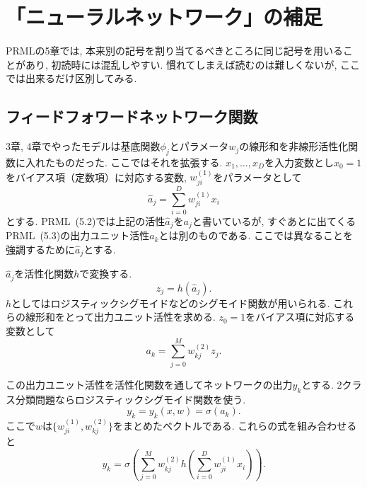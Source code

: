 \setcounter{chapter}{4}
\chapter{「ニューラルネットワーク」の補足}
PRMLの5章では, 本来別の記号を割り当てるべきところに同じ記号を用いることがあり, 初読時には混乱しやすい.
慣れてしまえば読むのは難しくないが, ここでは出来るだけ区別してみる.

\newcommand{\ww}[2]{w_{#1}^{(#2)}}
\newcommand{\calRR}[1]{{\cal R}\left\{#1 \right\}}
\newcommand{\deltaj}{\delta_j^{(1)}}
\newcommand{\deltak}{\delta_k^{(2)}}
\newcommand{\wmap}{w_{\rm MAP}}
\newcommand{\amap}{a_{\rm MAP}}

\section{フィードフォワードネットワーク関数}
3章, 4章でやったモデルは基底関数$\phi_j$とパラメータ$w_j$の線形和を非線形活性化関数に入れたものだった.
ここではそれを拡張する.
$x_1, \ldots, x_D$を入力変数とし$x_0=1$をバイアス項（定数項）に対応する変数, $w_{ji}^{(1)}$をパラメータとして
\begin{equation}\label{hat_a}
\hat{a}_j = \sum_{i=0}^D \ww{ji}{1} x_i
\end{equation}
とする.
PRML~(5.2)では上記の活性$\hat{a}_j$を$a_j$と書いているが,
すぐあとに出てくるPRML~(5.3)の出力ユニット活性$a_k$とは別のものである.
ここでは異なることを強調するために$\hat{a}_j$とする.

$\hat{a}_j$を活性化関数$h$で変換する.
$$
z_j=h(\hat{a}_j).
$$
$h$としてはロジスティックシグモイドなどのシグモイド関数が用いられる.
これらの線形和をとって出力ユニット活性を求める.
$z_0=1$をバイアス項に対応する変数として
$$
a_k=\sum_{j=0}^M \ww{kj}{2} z_j.
$$

この出力ユニット活性を活性化関数を通してネットワークの出力$y_k$とする.
2クラス分類問題ならロジスティックシグモイド関数を使う.
$$
y_k=y_k(x,w)=\sigma(a_k).
$$
ここで$w$は$\{\ww{ji}{1}, \ww{kj}{2}\}$をまとめたベクトルである.
これらの式を組み合わせると
$$
y_k=\sigma\left(\sum_{j=0}^M w_{kj}^{(2)} h \left(\sum_{i=0}^D w_{ji}^{(1)} x_i \right) \right).
$$
\vspace{0pt}


